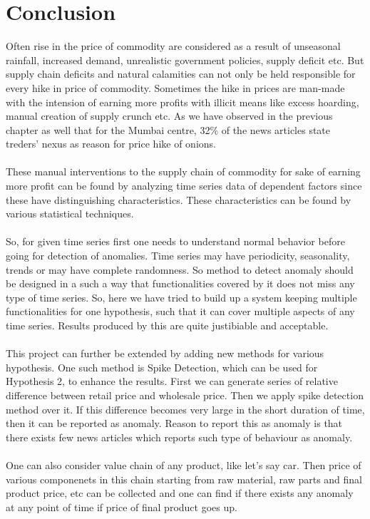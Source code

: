 \chapter{Conclusion}

Often rise in the price of commodity are considered as a result of unseasonal rainfall, increased demand, unrealistic government policies, supply deficit etc. But supply chain deficits and natural calamities can not only be held responsible for every hike in price of commodity. Sometimes the hike in prices are man-made with the intension of earning more profits with illicit means like excess hoarding, manual creation of supply crunch etc. As we have observed in the previous chapter as well that for the Mumbai centre, 32\% of the news articles state treders' nexus as reason for price hike of onions.\\
\\
These manual interventions to the supply chain of commodity for sake of earning more profit can be found by analyzing time series data of dependent factors since these have distinguishing characteristics. These characteristics can be found by various statistical techniques.\\
\\
So, for given time series first one needs to understand normal behavior before going for detection of anomalies. Time series may have periodicity, seasonality, trends or may have complete randomness. So method to detect anomaly should be designed in a such a way that functionalities covered by it does not miss any type of time series. So, here we have tried to build up a system keeping multiple functionalities for one hypothesis, such that it can cover multiple aspects of any time series. Results produced by this are quite justibiable and acceptable.\\
\\
This project can further be extended by adding new methods for various hypothesis. One such method is Spike Detection, which can be used for Hypothesis 2, to enhance the results. First we can generate series of relative difference between retail price and wholesale price. Then we apply spike detection method over it. If this difference becomes very large in the short duration of time, then it can be reported as anomaly. Reason to report this as anomaly is that there exists few news articles which reports such type of behaviour as anomaly.\\
\\
One can also consider value chain of any product, like let's say car. Then price of various componenets in this chain starting from raw material, raw parts and final product price, etc can be collected and one can find if there exists any anomaly at any point of time if price of final product goes up.\\
